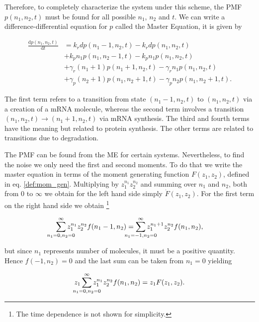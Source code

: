 Therefore, to completely characterize the system under this scheme, the PMF $p(n_1,n_2,t)$ must be found for all possible $n_1$, $n_2$ and $t$. We can write a difference-differential equation for $p$ called the Master Equation, it is given by

\begin{equation}
  \label{eq:master}
  \begin{split}
    \frac{\mathrm{d}p(n_1,n_2,t)}{\mathrm{d}t} &= k_rdp(n_1-1,n_2,t) - k_rdp(n_1,n_2,t)\\
&+ k_pn_1p(n_1,n_2-1,t) - k_pn_1p(n_1,n_2,t)\\
&+ \gamma_r(n_1+1)p(n_1+1,n_2,t) - \gamma_rn_1p(n_1,n_2,t)\\
&+ \gamma_p(n_2+1)p(n_1,n_2+1,t) - \gamma_pn_2p(n_1,n_2+1,t).
  \end{split}
\end{equation}

The first term refers to a transition from state $(n_1-1,n_2,t)$ to $(n_1,n_2,t)$ via a creation of a mRNA molecule, whereas the second term involves a transition $(n_1,n_2,t) \rightarrow (n_1+1,n_2,t)$ via mRNA synthesis. The third and fourth terms have the meaning but related to protein synthesis. The other terms are related to transitions due to degradation.


The PMF can be found from the ME for certain systems. Nevertheless, to find the noise we only need the first and second moments. To do that we write the master equation in terms of the moment generating function $F(z_1,z_2)$, defined in eq. \eqref{def:mom_gen}. Multiplying by $z_1^{n_1}z_2^{n_2}$ and summing over $n_1$ and $n_2$, both from $0$ to $\infty$ we obtain for the left hand side simply $\dot{F}(z_1,z_2)$. For the first term on the right hand side we obtain \footnote{The time dependence is not shown for simplicity.}

\begin{equation*}
  \sum_{\mathclap{n_1=0,n_2=0}}^\infty z_1^{n_1}z_2^{n_2}f(n_1-1,n_2) = \sum_{\mathclap{n_1=-1,n_2=0}}^\infty z_1^{n_1+1}z_2^{n_2}f(n_1,n_2),
\end{equation*}

but since $n_1$ represents number of molecules, it must be a positive quantity. Hence $f(-1,n_2)=0$ and the last sum can be taken from $n_1=0$ yielding

\begin{equation*}
  z_1 \sum_{\mathclap{n_1=0,n_2=0}}^\infty z_1^{n_1}z_2^{n_2}f(n_1,n_2) = z_1F(z_1,z_2).
\end{equation*}

